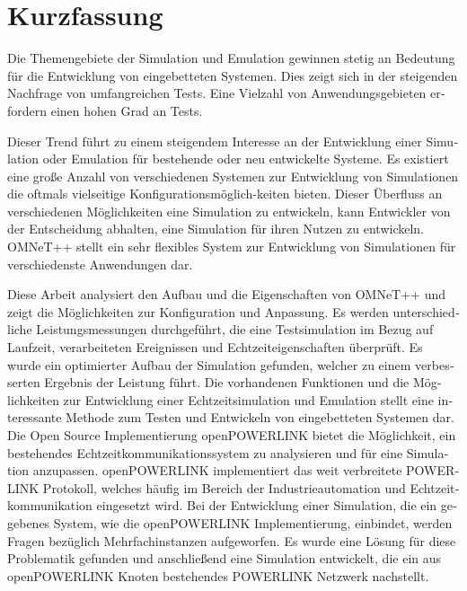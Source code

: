 
\chapter{Kurzfassung}
\begin{german}
Die Themengebiete der Simulation und Emulation gewinnen stetig an Bedeutung für die Entwicklung von eingebetteten Systemen.
Dies zeigt sich in der steigenden Nachfrage von umfangreichen Tests.
Eine Vielzahl von Anwendungsgebieten erfordern einen hohen Grad an Tests.

Dieser Trend führt zu einem steigendem Interesse an der Entwicklung einer Simulation oder Emulation für bestehende oder neu entwickelte Systeme.
Es existiert eine große Anzahl von verschiedenen Systemen zur Entwicklung von Simulationen die oftmals vielseitige Konfigurationsmöglich-keiten bieten.
Dieser Überfluss an verschiedenen Möglichkeiten eine Simulation zu entwickeln, kann Entwickler von der Entscheidung abhalten, eine Simulation für ihren Nutzen zu entwickeln.
OMNeT++ stellt ein sehr flexibles System zur Entwicklung von Simulationen für verschiedenste Anwendungen dar.

\begin{sloppypar}
Diese Arbeit analysiert den Aufbau und die Eigenschaften von OMNeT++ und zeigt die Möglichkeiten zur Konfiguration und Anpassung.
Es werden unterschiedliche Leistungsmessungen durchgeführt, die eine Testsimulation im Bezug auf Laufzeit, verarbeiteten Ereignissen und Echtzeiteigenschaften überprüft.
Es wurde ein optimierter Aufbau der Simulation gefunden, welcher zu einem verbesserten Ergebnis der Leistung führt.
Die vorhandenen Funktionen und die Möglichkeiten zur Entwicklung einer Echtzeitsimulation und Emulation stellt eine interessante Methode zum Testen und Entwickeln von eingebetteten Systemen dar.
Die Open Source Implementierung openPOWERLINK bietet die Möglichkeit, ein bestehendes Echtzeitkommunikationssystem zu analysieren und für eine Simulation anzupassen.
openPOWERLINK implementiert das weit verbreitete POWERLINK Protokoll, welches häufig im Bereich der Industrieautomation und Echtzeitkommunikation eingesetzt wird.
Bei der Entwicklung einer Simulation, die ein gegebenes System, wie die openPOWERLINK Implementierung, einbindet, werden Fragen bezüglich Mehrfachinstanzen aufgeworfen.
Es wurde eine Lösung für diese Problematik gefunden und anschließend eine Simulation entwickelt, die ein aus openPOWERLINK Knoten bestehendes POWERLINK Netzwerk nachstellt.
\end{sloppypar}
    
\end{german}
